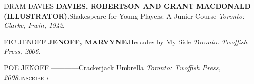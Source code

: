 \documentclass[10pt]{article}
\begin{document}
DRAM DAVIES\newline
\MakeUppercase{\textsf{\textbf{\textbf{Davies, Robertson} and \textbf{Grant MacDonald} (Illustrator).}}}\hspace{1em}\textsf{Shakespeare for Young Players: A Junior Course}
\newline
\textit{Toronto: Clarke, Irwin, 1942.}\newline


FIC JENOFF\newline
\MakeUppercase{\textsf{\textbf{\textbf{Jenoff, Marvyne}.}}}\hspace{1em}\textsf{Hercules by My Side}
\newline
\textit{Toronto: Twoffish Press, 2006.}\newline


POE JENOFF\newline
------------\hspace{1em}\textsf{Crackerjack Umbrella}
\newline
\textit{Toronto: Twoffish Press, 2008.}\newline\textsc{inscribed}\newline
\end{document}
